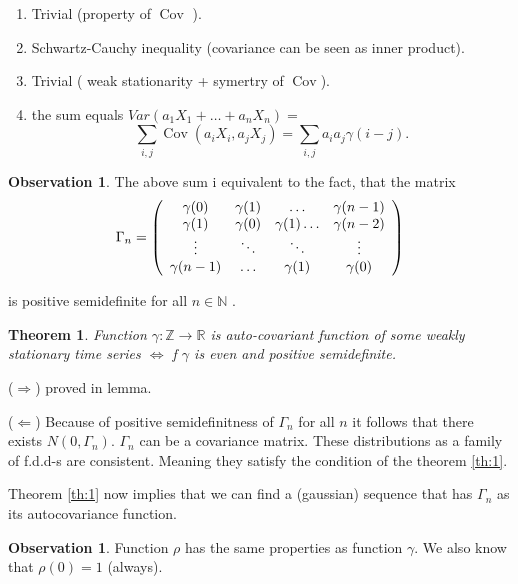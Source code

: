 \documentclass[12pt,a4paper, notitlepage]{book}
\theoremstyle{definition} %
\newtheorem{observation}[definition]{Observation}
\theoremstyle{plain} %
\newtheorem{theorem}[definition]{Theorem}
\newcommand{\R}{\mathbb R}
\newcommand{\N}{\mathbb N}
\newcommand{\Z}{\mathbb Z}
\DeclareMathOperator{\Cov}{Cov}
\begin{document}
\proof
\begin{enumerate}
\item Trivial (property of $ \Cov $ ).
\item Schwartz-Cauchy inequality (covariance can be seen as inner product).
\item Trivial ( weak stationarity + symertry of $ \Cov $).
\item the sum equals $Var(a_1X_1 + \dots + a_n X_n) =$
\[  \sum_{i,j} \Cov(a_iX_i,a_jX_j) = \sum _{ i,j} a_i a_j \gamma(i-j) . \] 
\end{enumerate}
\endproof

\begin{observation}
The above sum i equivalent to the fact, that the
matrix 
\[ \Gamma_n = 
\left( \begin{array} {c c c c} 
 \gamma(0) & \gamma(1)  & \ldots & \gamma(n-1) \\
\gamma(1) & \gamma(0) & \gamma(1) \ldots & \gamma(n-2) \\
\vdots & \ddots & \ddots & \vdots \\
\gamma(n-1) & \ldots & \gamma(1) & \gamma(0)
\end{array} \right)
\]

is positive semidefinite for all $ n \in \N $ .
\end{observation}


\begin{theorem}
Function $\gamma: \Z \rightarrow \R$ is auto-covariant function of some weakly stationary time series 
$ \iff  $ f
$\gamma$ is even and positive semidefinite.
\end{theorem}


\proof
($\Rightarrow$) proved in lemma.

($ \Leftarrow$) Because of positive semidefinitness of $\Gamma_n$ for all $n$ it follows that there exists $N(0, \Gamma_n)$. $
\Gamma_n$ can be a covariance matrix. These distributions as a family of f.d.d-s are consistent. Meaning they satisfy the 
condition of the theorem 
\ref{th:1}.

Theorem \ref{th:1} now implies that we can find a (gaussian) sequence that has $\Gamma_n$ as its autocovariance function.

\endproof

\begin{observation}
Function $\rho$ has the same properties as function $\gamma$. We also know that $\rho(0) = 1$ (always).
\end{observation}
\end{document}
